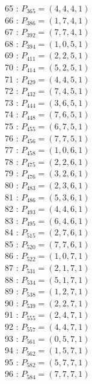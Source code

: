\documentclass{article}
\begin{document}
{\begin{multicols}{3}
65 : $P_{365}=( 4, 4, 4, 1 )$\\
66 : $P_{386}=( 1, 7, 4, 1 )$\\
67 : $P_{392}=( 7, 7, 4, 1 )$\\
68 : $P_{394}=( 1, 0, 5, 1 )$\\
69 : $P_{411}=( 2, 2, 5, 1 )$\\
70 : $P_{414}=( 5, 2, 5, 1 )$\\
71 : $P_{429}=( 4, 4, 5, 1 )$\\
72 : $P_{432}=( 7, 4, 5, 1 )$\\
73 : $P_{444}=( 3, 6, 5, 1 )$\\
74 : $P_{448}=( 7, 6, 5, 1 )$\\
75 : $P_{455}=( 6, 7, 5, 1 )$\\
76 : $P_{456}=( 7, 7, 5, 1 )$\\
77 : $P_{458}=( 1, 0, 6, 1 )$\\
78 : $P_{475}=( 2, 2, 6, 1 )$\\
79 : $P_{476}=( 3, 2, 6, 1 )$\\
80 : $P_{483}=( 2, 3, 6, 1 )$\\
81 : $P_{486}=( 5, 3, 6, 1 )$\\
82 : $P_{493}=( 4, 4, 6, 1 )$\\
83 : $P_{495}=( 6, 4, 6, 1 )$\\
84 : $P_{515}=( 2, 7, 6, 1 )$\\
85 : $P_{520}=( 7, 7, 6, 1 )$\\
86 : $P_{522}=( 1, 0, 7, 1 )$\\
87 : $P_{531}=( 2, 1, 7, 1 )$\\
88 : $P_{534}=( 5, 1, 7, 1 )$\\
89 : $P_{538}=( 1, 2, 7, 1 )$\\
90 : $P_{539}=( 2, 2, 7, 1 )$\\
91 : $P_{555}=( 2, 4, 7, 1 )$\\
92 : $P_{557}=( 4, 4, 7, 1 )$\\
93 : $P_{561}=( 0, 5, 7, 1 )$\\
94 : $P_{562}=( 1, 5, 7, 1 )$\\
95 : $P_{582}=( 5, 7, 7, 1 )$\\
96 : $P_{584}=( 7, 7, 7, 1 )$\\
\end{multicols}


%


%


}%
\end{document}
